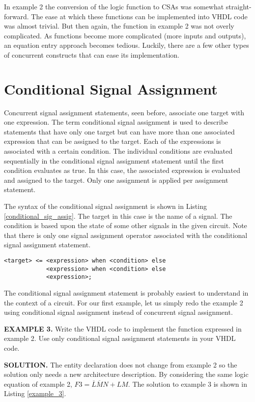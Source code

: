 In example 2 the conversion of the logic function to CSAs was somewhat straight-forward. The ease at which these functions can be implemented into VHDL code was almost trivial. But then again, the function in example 2 was not overly complicated. As functions become more complicated (more inputs and outputs), an equation entry approach becomes tedious. Luckily, there are a few other types of concurrent constructs that can ease its implementation.

\section{Conditional Signal Assignment}
Concurrent signal assignment statements, seen before, associate one target with one expression. The term conditional signal assignment is used to describe statements that have only one target but can have more than one associated expression that can be assigned to the target. Each of the expressions is associated with a certain condition. The individual conditions are evaluated sequentially in the conditional signal assignment statement until the first condition evaluates as true. In this case, the associated expression is evaluated and assigned to the target. Only one assignment is applied per assignment statement.

The syntax of the conditional signal assignment is shown in Listing \ref{conditional_sig_assig}. The target in this case is the name of a signal. The condition is based upon the state of some other signals in the given circuit. Note that there is only one signal assignment operator associated with the conditional signal assignment statement.

\begin{lstlisting}[label=conditional_sig_assig, caption=The syntax for the conditional signal assignment statement.]
<target> <=	<expression> when <condition> else
			<expression> when <condition> else
			<expression>;
\end{lstlisting}

The conditional signal assignment statement is probably easiest to understand in the context of a circuit. For our first example, let us simply redo the example 2 using conditional signal assignment instead of concurrent signal assignment.

\begin{leftbar}
\noindent
\textbf{EXAMPLE 3.}
Write the VHDL code to implement the function expressed in example 2. Use only conditional signal assignment statements in your VHDL code. 
\end{leftbar}
\noindent
\textbf{SOLUTION.} The entity declaration does not change from example 2 so the solution only needs a new architecture description. By considering the same logic equation of example 2, $F3=\overline{L}\overline{M}N+LM$. The solution to example 3 is shown in Listing \ref{example_3}.

